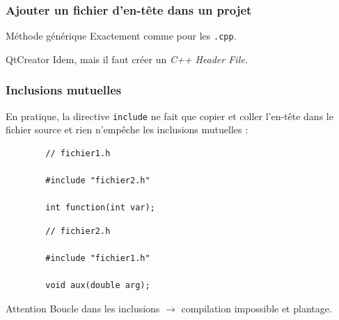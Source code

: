 \begin{frame}
\frametitle{Ajouter un fichier d'en-tête dans un projet}

\begin{block}{Méthode générique}
	Exactement comme pour les \texttt{.cpp}.
\end{block}

\begin{block}{QtCreator}
	Idem, mais il faut créer un \textit{C++ Header File}.
\end{block}

\end{frame}

\begin{frame}[fragile=singleslide]
\frametitle{Inclusions mutuelles}

En pratique, la directive \texttt{include} ne fait que copier et coller l'en-tête dans le fichier source et rien n'empêche les inclusions mutuelles :

\begin{minipage}{0.47\linewidth}
	\begin{verbatim}
		// fichier1.h
		
		#include "fichier2.h"
		
		int function(int var);
	\end{verbatim}
\end{minipage}
\begin{minipage}{0.47\linewidth}
	\begin{verbatim}
		// fichier2.h
		
		#include "fichier1.h"
		
		void aux(double arg);
	\end{verbatim}
\end{minipage}

	\begin{alertblock}{Attention}
		Boucle dans les inclusions $\rightarrow$ compilation impossible et plantage.
	\end{alertblock}
\end{frame}

